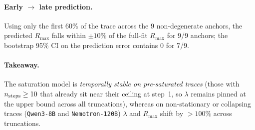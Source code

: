 \paragraph{Early $\to$ late prediction.}
 Using only the first 60\% of the trace across the 9 non-degenerate anchors, the predicted $R_{\max}$ falls within $\pm 10\%$ of the full-fit $R_{\max}$ for 9/9 anchors; the bootstrap 95\% CI on the prediction error contains 0 for 7/9.
\paragraph{Takeaway.}
 The saturation model is \emph{temporally stable on pre-saturated traces} (those with $n_{\rm steps}\ge 10$ that already sit near their ceiling at step~1, so $\lambda$ remains pinned at the upper bound across all truncations), whereas on non-stationary or collapsing traces (\texttt{Qwen3-8B} and \texttt{Nemotron-120B}) $\lambda$ and $R_{\max}$ shift by $>100\%$ across truncations.
